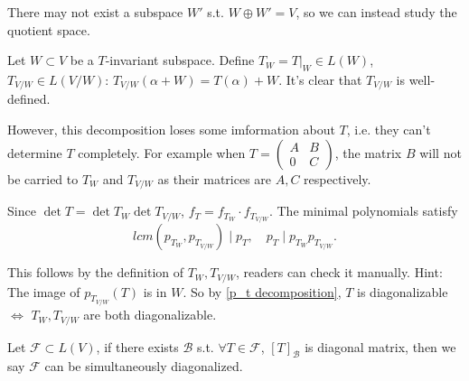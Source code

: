 
There may not exist a subspace $W'$ s.t.  $W\oplus W' = V$, so we can instead
study the quotient space.

Let $W \subset V$ be a $T$-invariant subspace.
Define $T_W = T|_W\in L(W)$, $T_{V/W}\in L(V/W)$:
$T_{V /W}(\alpha+W) = T(\alpha) + W$. It's clear that $T_{V /W}$ is well-defined.

However, this decomposition loses some imformation about $T$, i.e. they can't
determine  $T$ completely. For example when $T=\begin{pmatrix}
	A &B \\ 0 &C
\end{pmatrix}$, the matrix $B$ will not be carried to
$T_W$ and $T_{V /W}$ as their matrices are $A, C$ respectively.

Since $\det T = \det T_W \det T_{V /W}$, $f_T = f_{T_W}\cdot f_{T_{V /W}}$.
The minimal polynomials satisfy
\[lcm(p_{T_W}, p_{T_{V/W}}) \mid p_T, \quad
p_T \mid p_{T_W} p_{T_{V /W}}.\]

This follows by the definition of $T_W, T_{V /W}$, readers can check it manually.
Hint: The image of $p_{T_{V /W}}(T)$ is in $W$.
So by \autoref{p_t decomposition}, $T$ is diagonalizable $\iff$ $T_W,T_{V /W}$
are both diagonalizable.

\begin{definition}
	Let $\mathcal{F} \subset L(V)$, if there exists $\mathcal{B}$ s.t.
	$\forall T\in \mathcal{F}$, $[T]_{\mathcal{B}}$ is diagonal matrix,
	then we say $\mathcal{F}$ can be simultaneously diagonalized.
\end{definition}


